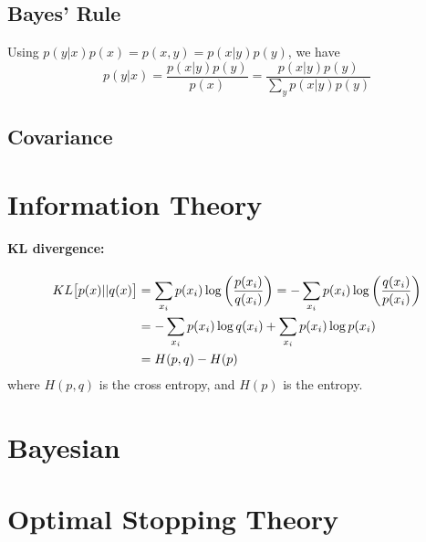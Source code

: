 \documentclass[11pt]{article}
\begin{document}
\subsection{Bayes' Rule}
Using $p(y|x) p(x) = p(x, y) = p(x|y) p(y)$, we have
\begin{equation}
  p(y|x) = \frac{p(x|y) p(y)}{p(x)} = \frac{p(x|y) p(y)}{\sum\limits_y p(x|y) p(y)}
\end{equation}

\subsection{Covariance}


\section{Information Theory}
\paragraph{KL divergence:}
\begin{align}
  KL\big[p(x) || q(x)\big] &= \sum_{x_i} p(x_i) \log\left(\frac{p(x_i)}{q(x_i)} \right)
                              = -\sum_{x_i} p(x_i) \log\left(\frac{q(x_i)}{p(x_i)}
                              \right) \nonumber\\ 
  &= -\sum_{x_i} p(x_i) \log q(x_i) + \sum_{x_i} p(x_i) \log p(x_i) \nonumber\\
  &= H(p,q) - H(p)
\end{align}
where $H(p,q)$ is the cross entropy, and $H(p)$ is the entropy.


\section{Bayesian}



\section{Optimal Stopping Theory}





\end{document}
